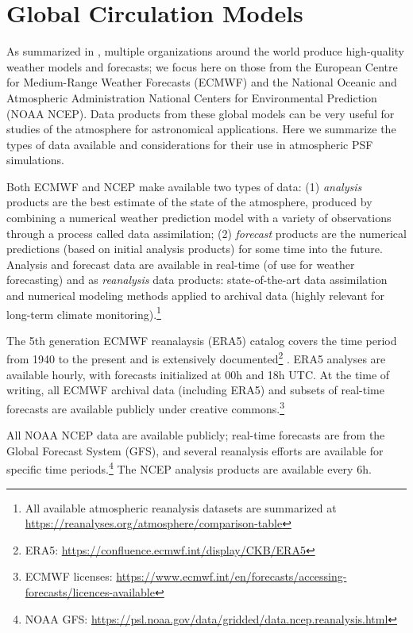 \documentclass[twocolumn,twocolappendix]{openjournal}
\begin{document}
\appendix
\section*{Global Circulation Models}\label{app:gcm}
As summarized in , multiple organizations around the world produce high-quality weather models and forecasts; we focus here on those from the European Centre for Medium-Range Weather Forecasts (ECMWF) and the National Oceanic and Atmospheric Administration National Centers for Environmental Prediction (NOAA NCEP). 
Data products from these global models can be very useful for studies of the atmosphere for astronomical applications.
Here we summarize the types of data available and considerations for their use in atmospheric PSF simulations.

Both ECMWF and NCEP make available two types of data: 
(1) \textit{analysis} products are the best estimate of the state of the atmosphere, produced by combining a numerical weather prediction model with a variety of observations through a process called data assimilation; 
(2) \textit{forecast} products are the numerical predictions (based on initial analysis products) for some time into the future.
Analysis and forecast data are available in real-time (of use for weather forecasting) and as \textit{reanalysis} data products: state-of-the-art data assimilation and numerical modeling methods applied to archival data (highly relevant for long-term climate monitoring).\footnote{All available atmospheric reanalysis datasets are summarized at \url{https://reanalyses.org/atmosphere/comparison-table}}

The 5th generation ECMWF reanalaysis (ERA5) catalog covers the time period from 1940 to the present and is extensively documented\footnote{ERA5: \url{https://confluence.ecmwf.int/display/CKB/ERA5}} \citep{hersbach_era5_2020}.
ERA5 analyses are available hourly, with forecasts initialized at 00h and 18h UTC.
At the time of writing, all ECMWF archival data (including ERA5) and subsets of real-time forecasts are available publicly under creative commons.\footnote{ECMWF licenses: \url{https://www.ecmwf.int/en/forecasts/accessing-forecasts/licences-available}}

All NOAA NCEP data are available publicly; real-time forecasts are from the Global Forecast System (GFS), and several reanalysis efforts are available for specific time periods.\footnote{NOAA GFS: \url{https://psl.noaa.gov/data/gridded/data.ncep.reanalysis.html}}
The NCEP analysis products are available every 6h.
\end{document}
